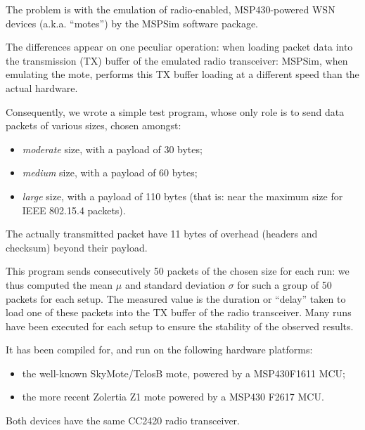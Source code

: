 \documentclass[10pt,final,journal,twocolumn]{IEEEtran}
\begin{document}
The problem is with the emulation of radio-enabled, MSP430-powered WSN
devices (a.k.a. ``motes'') by the MSPSim software package.

The differences appear on one peculiar operation: when loading packet data
into the transmission (TX) buffer of the emulated radio transceiver:
MSPSim, when emulating the mote, performs this TX buffer loading at
a different speed than the actual hardware.

Consequently, we wrote a simple test program, whose only role is to send
data packets of various sizes, chosen amongst:
\begin{itemize}
\item \emph{moderate} size, with a payload of 30 bytes;
\item \emph{medium} size, with a payload of 60 bytes;
\item \emph{large} size, with a payload of 110 bytes (that is:
      near the maximum size for IEEE 802.15.4 packets\footnotemark[1]).
\end{itemize}
The actually transmitted packet have 11 bytes of overhead (headers and
checksum) beyond their payload.

This program sends consecutively 50 packets of the chosen size for each run:
we thus computed the mean $\mu$ and standard deviation $\sigma$ for such
a group of 50 packets for each setup. The measured value is the duration
or ``delay'' taken to load one of these packets into the TX buffer of
the radio transceiver. Many runs have been executed for each setup
to ensure the stability of the observed results.

It has been compiled for, and run on the following hardware platforms:
\begin{itemize}
\item the well-known SkyMote/TelosB mote, powered by a MSP430F1611 MCU;
\item the more recent Zolertia Z1 mote powered by a MSP430 F2617 MCU.
\end{itemize}
Both devices have the same CC2420 radio transceiver.
\end{document}

